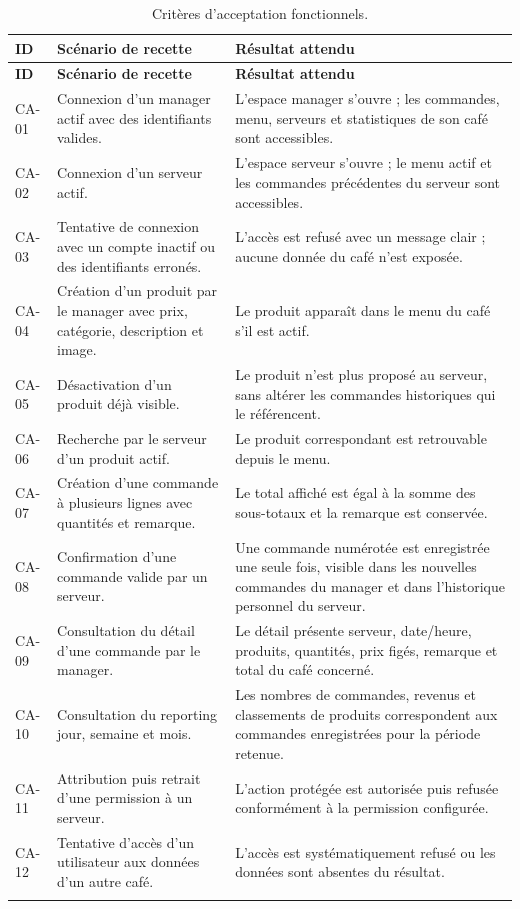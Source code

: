 \documentclass[11pt,a4paper]{article}
\begin{document}
\begin{longtable}{P{0.1\textwidth}P{0.31\textwidth}P{0.50\textwidth}}
\toprule
\textbf{ID} & \textbf{Scénario de recette} & \textbf{Résultat attendu} \\
\midrule
\endfirsthead
\toprule
\textbf{ID} & \textbf{Scénario de recette} & \textbf{Résultat attendu} \\
\midrule
\endhead
CA-01 & Connexion d’un manager actif avec des identifiants valides. & L’espace manager s’ouvre ; les commandes, menu, serveurs et statistiques de son café sont accessibles. \\
CA-02 & Connexion d’un serveur actif. & L’espace serveur s’ouvre ; le menu actif et les commandes précédentes du serveur sont accessibles. \\
CA-03 & Tentative de connexion avec un compte inactif ou des identifiants erronés. & L’accès est refusé avec un message clair ; aucune donnée du café n’est exposée. \\
CA-04 & Création d’un produit par le manager avec prix, catégorie, description et image. & Le produit apparaît dans le menu du café s’il est actif. \\
CA-05 & Désactivation d’un produit déjà visible. & Le produit n’est plus proposé au serveur, sans altérer les commandes historiques qui le référencent. \\
CA-06 & Recherche par le serveur d’un produit actif. & Le produit correspondant est retrouvable depuis le menu. \\
CA-07 & Création d’une commande à plusieurs lignes avec quantités et remarque. & Le total affiché est égal à la somme des sous-totaux et la remarque est conservée. \\
CA-08 & Confirmation d’une commande valide par un serveur. & Une commande numérotée est enregistrée une seule fois, visible dans les nouvelles commandes du manager et dans l’historique personnel du serveur. \\
CA-09 & Consultation du détail d’une commande par le manager. & Le détail présente serveur, date/heure, produits, quantités, prix figés, remarque et total du café concerné. \\
CA-10 & Consultation du reporting jour, semaine et mois. & Les nombres de commandes, revenus et classements de produits correspondent aux commandes enregistrées pour la période retenue. \\
CA-11 & Attribution puis retrait d’une permission à un serveur. & L’action protégée est autorisée puis refusée conformément à la permission configurée. \\
CA-12 & Tentative d’accès d’un utilisateur aux données d’un autre café. & L’accès est systématiquement refusé ou les données sont absentes du résultat. \\
\bottomrule
\caption{Critères d’acceptation fonctionnels.}\label{tab:acceptance}
\end{longtable}
\end{document}
